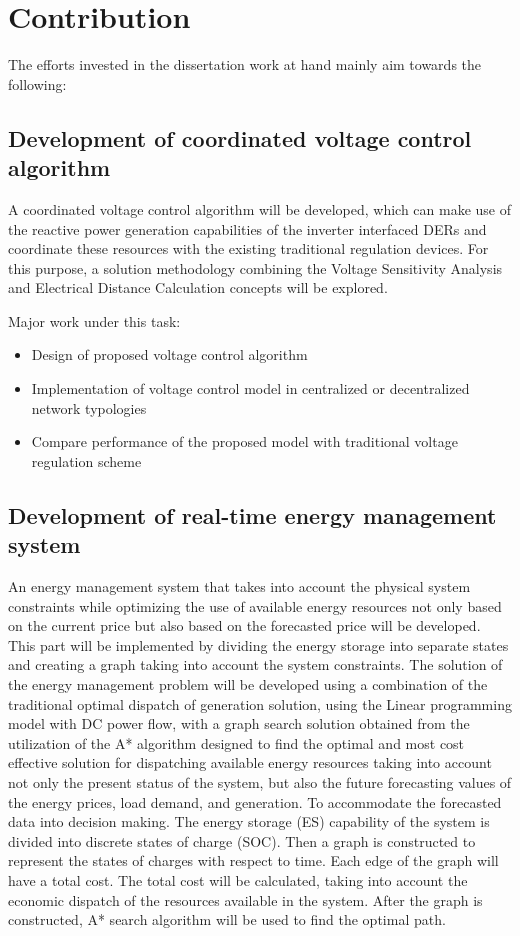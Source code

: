 \section{Contribution}
The efforts invested in the dissertation work at hand mainly aim towards the following:
 
\subsection{Development of coordinated voltage control algorithm}
A coordinated voltage control algorithm will be developed, which can make use of the reactive power generation capabilities of the inverter interfaced DERs and coordinate these resources with the existing traditional regulation devices. For this purpose, a solution methodology combining the Voltage Sensitivity Analysis \cite{Th_ali} and Electrical Distance Calculation \cite{Alvi3} concepts will be explored.

Major work under this task:
\begin{itemize}
    \item Design of proposed voltage control algorithm 
    \item Implementation of voltage control model in centralized or decentralized network typologies
    \item Compare performance of the proposed model with traditional voltage regulation scheme
\end{itemize}

\subsection{Development of real-time energy management system}
An energy management system that takes into account the physical system constraints while optimizing the use of available energy resources not only based on the current price but also based on the forecasted price will be developed. This part will be implemented by dividing the energy storage into separate states and creating a graph taking into account the system constraints. The solution of the energy management problem will be developed using a combination of the traditional optimal dispatch of generation solution, using the Linear programming model with DC power flow, with a graph search solution obtained from the utilization of the A* algorithm designed to find the optimal and most cost effective solution for dispatching available energy resources taking into account not only the present status of the system, but also the future forecasting values of the energy prices, load demand, and generation.
To accommodate the forecasted data into decision making. The energy storage (ES) capability of the system is divided into discrete states of charge (SOC). Then a graph is constructed to represent the states of charges with respect to time. Each edge of the graph will have a total cost. The total cost will be calculated, taking into account the economic dispatch of the resources available in the system. After the graph is constructed, A* search algorithm will be used to find the optimal path.

